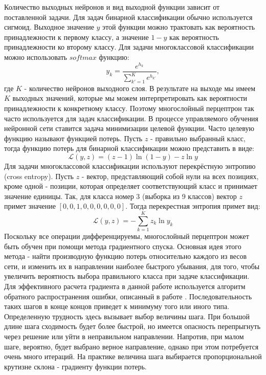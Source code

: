     Количество выходных нейронов и вид выходной функции зависит от поставленной задачи. Для задач бинарной классификации обычно используется сигмоид. Выходное значение $y$ этой функции можно трактовать как вероятность принадлежности к первому классу, а значение $1-y$ как вероятность принадлежности ко второму классу.
    Для задачи многоклассовой классификации можно использовать $softmax$ функцию:
    \begin{equation}\label{softmax}
    y_{k}=\frac{e^{h_{k}}}{\sum_{k{}'=1}^{K}e^{h_{k{}'}}} ,
    \end{equation}
    где $K$ - количество нейронов выходного слоя. В результате на выходе мы имеем $K$ выходных значений, которые мы можем интерпретировать как вероятности принадлежности к конкретному классу. Поэтому многослойный перцептрон так часто используется для задач классификации. В процессе управляемого обучения нейронной сети ставится задача минимизации целевой функции.
    Часто целевую функцию называют функцией потерь. Пусть $z$ - правильно выбранный класс, тогда функцию потерь для бинарной классификации можно представить в виде:
    \begin{equation}
    \mathcal{L}(y,z) = (z-1) \ln (1-y)-z \ln y
    \end{equation}
    Для задачи многоклассовой классификации используют перекрёстную энтропию (cross entropy). Пусть $z$ - вектор, представляющий собой нули на всех позициях, кроме одной - позиции, которая определяет соответствующий класс и принимает значение единицы. Так, для класса номер 3 (выборка из 9 классов) вектор $z$ примет значение $[0,0,1,0,0,0,0,0,0]$. Тогда перекрестная энтропия примет вид:
    \begin{equation}
    \mathcal{L}(y,z) = -\sum_{k=1}^{K}{z_{k} \ln y_{k}}
    \end{equation}
    Поскольку все операции дифференцируемы, многослойный перцептрон может быть обучен при помощи метода градиентного спуска. Основная идея этого метода - найти производную функцию потерь относительно каждого из весов сети, и изменить их в направлении наиболее быстрого убывания, для того, чтобы увеличить вероятность выбора правильного класса при задаче классификации.
    Для эффективного расчета градиента в данной работе используется алгоритм обратного распространения ошибки, описанный в работе \cite{Williams}. Последовательность таких шагов в конце концов приведет к минимуму того или иного типа. Определенную трудность здесь вызывает выбор величины шага. При большой длине шага сходимость будет более быстрой, но имеется опасность пе­репрыгнуть через решение или уйти в неправильном направлении. Напротив, при малом шаге, вероятно, будет выбрано верное на­правление, однако при этом потребуется очень много итераций. На практике величина шага выбирается пропорциональной крутизне склона - градиенту функции потерь.

